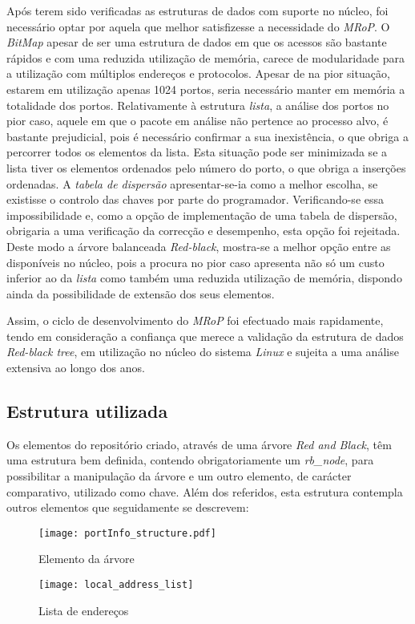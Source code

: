 Após terem sido verificadas as estruturas de dados com suporte no núcleo, foi necessário optar por aquela que melhor satisfizesse a necessidade do \textit{MRoP}.
O \textit{BitMap} apesar de ser uma estrutura de dados em que os acessos são bastante rápidos e com uma reduzida utilização de memória, carece de modularidade para a utilização com múltiplos endereços e protocolos.
Apesar de na pior situação, estarem em utilização apenas 1024 portos, seria necessário manter em memória a totalidade dos portos.
Relativamente à estrutura \textit{lista}, a análise dos portos no pior caso, aquele em que o pacote em análise não pertence ao processo alvo, é bastante prejudicial, pois é necessário confirmar a sua inexistência, o que obriga a percorrer todos os elementos da lista.
Esta situação pode ser minimizada se a lista tiver os elementos ordenados pelo número do porto, o que obriga a inserções ordenadas.
A \textit{tabela de dispersão} apresentar-se-ia como a melhor escolha, se existisse o controlo das chaves por parte do programador.
Verificando-se essa impossibilidade e, como a opção de implementação de uma tabela de dispersão, obrigaria a uma verificação da correcção e desempenho, esta opção foi rejeitada.  
Deste modo a árvore balanceada \textit{Red-black}, mostra-se a melhor opção entre as disponíveis no núcleo, pois a procura no pior caso apresenta não só um custo inferior ao da \textit{lista} como também uma reduzida utilização de memória, dispondo ainda da possibilidade de extensão dos seus elementos.

Assim, o ciclo de desenvolvimento do \textit{MRoP} foi efectuado mais rapidamente, tendo em consideração a confiança que merece a validação da estrutura de dados \textit{Red-black tree}, em utilização no núcleo do sistema \textit{Linux} e sujeita a uma análise extensiva ao longo dos anos.
 
\subsection{Estrutura utilizada}
\label{sub:repo_structure}

Os elementos do repositório criado, através de uma árvore \textit{Red and Black}, têm uma estrutura bem definida, contendo obrigatoriamente um \textit{rb\_node}, para possibilitar a manipulação da árvore e um outro elemento, de carácter comparativo, utilizado como chave.
Além dos referidos, esta estrutura contempla outros elementos que seguidamente se descrevem:

\begin{figure}[ht]
\begin{minipage}[b]{0.5\linewidth}
\centering
\texttt{[image: portInfo\_structure.pdf]}
\caption{Elemento da árvore}
\label{fig:portInfo}
\end{minipage}
\hspace{0.5cm}
\begin{minipage}[b]{0.5\linewidth}
\centering
\texttt{[image: local\_address\_list]}
\caption{Lista de endereços}
\label{fig:local_address_list}
\end{minipage}
\end{figure}

